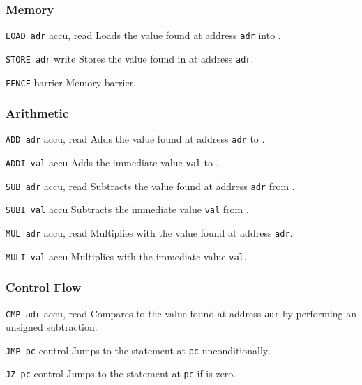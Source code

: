
\subsubsection{Memory}

{\texttt{LOAD adr}}
{accu, read}
{Loads the value found at address \texttt{adr} into \accu.}

{\texttt{STORE adr}}
{write}
{Stores the value found in \accu{} at address \texttt{adr}.}

{\texttt{FENCE}}
{barrier}
{Memory barrier.}

\subsubsection{Arithmetic}

{\texttt{ADD adr}}
{accu, read}
{Adds the value found at address \texttt{adr} to \accu.}

{\texttt{ADDI val}}
{accu}
{Adds the immediate value \texttt{val} to \accu.}

{\texttt{SUB adr}}
{accu, read}
{Subtracts the value found at address \texttt{adr} from \accu.}

{\texttt{SUBI val}}
{accu}
{Subtracts the immediate value \texttt{val} from \accu.}

{\texttt{MUL adr}}
{accu, read}
{Multiplies \accu{} with the value found at address \texttt{adr}.}

{\texttt{MULI val}}
{accu}
{Multiplies \accu{} with the immediate value \texttt{val}.}

\subsubsection{Control Flow}

{\texttt{CMP adr}}
{accu, read}
{Compares \accu{} to the value found at address \texttt{adr} by performing an unsigned subtraction.}

{\texttt{JMP pc}}
{control}
{Jumps to the statement at \texttt{pc} unconditionally.}

{\texttt{JZ pc}}
{control}
{Jumps to the statement at \texttt{pc} if \accu{} is zero.}

